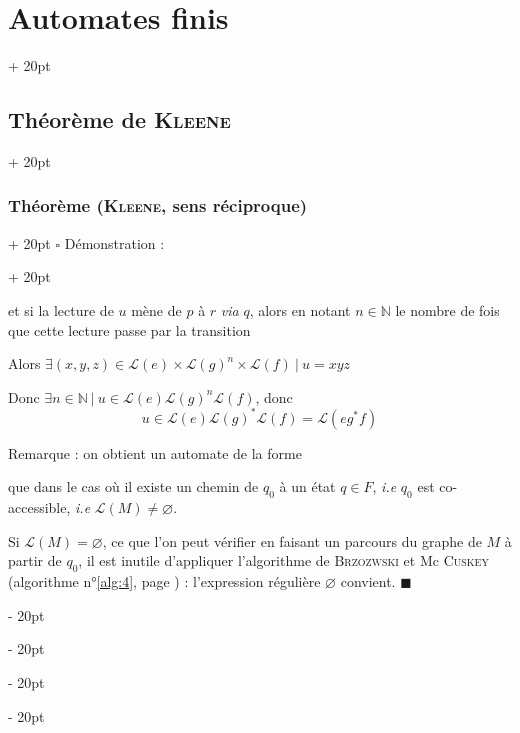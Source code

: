 \documentclass[a4paper, 12pt, twoside]{article}
\newcommand{\N}{\mathbb{N}} %
\newcommand{\ind}[1][20pt]{\advance\leftskip + #1}
\newcommand{\deind}[1][20pt]{\advance\leftskip - #1}
\newenvironment{indt}[2][20pt]{#2 \par \ind[#1]}{\par \deind} %
\newenvironment{proof}[1][{Démonstration :}]{\begin{indt}{$\square$ #1}}{$\blacksquare$ \end{indt}}
\begin{document}
\begin{indt}{\section{Automates finis}}
\begin{indt}{\subsection{Théorème de \textsc{Kleene}}}
\begin{indt}{\subsubsection{Théorème (\textsc{Kleene}, sens réciproque)}}
\begin{proof}
\begin{center}
                    \end{center}
                    et si la lecture de $u$ mène de $p$ à $r$ \textit{via} $q$, alors en notant $n \in \N$ le nombre de fois que cette lecture passe par la transition
                    \begin{center}
                    \end{center}
                    Alors $\exists (x, y, z) \in \mathcal L(e) \times \mathcal L(g)^n \times \mathcal L(f)\ |\ u = xyz$

                    Donc $\exists n \in \N\ |\ u \in \mathcal L(e) \mathcal L(g)^n \mathcal L(f)$, donc
                    \[
                        u \in \mathcal L(e) \mathcal L(g)^* \mathcal L(f)
                        = \mathcal L(eg^*f)
                    \]

                    \vspace{6pt}
                    
                    Remarque : on obtient un automate de la forme
                    \begin{center}
                    \end{center}
                    que dans le cas où il existe un chemin de $q_0$ à un état $q \in F$, \textit{i.e} $q_0$ est co-accessible, \textit{i.e} $\mathcal L(M) \neq \varnothing$.

                    Si $\mathcal L(M) = \varnothing$, ce que l'on peut vérifier en faisant un parcours du graphe de $M$ à partir de $q_0$, il est inutile d'appliquer l'algorithme de \textsc{Brzozwski} et Mc \textsc{Cuskey} (algorithme n°\ref{alg:4}, page \pageref{alg:4}) : l'expression régulière $\varnothing$ convient.
                \end{proof}
            \end{indt}


\end{indt}
\end{indt}
\end{document}
